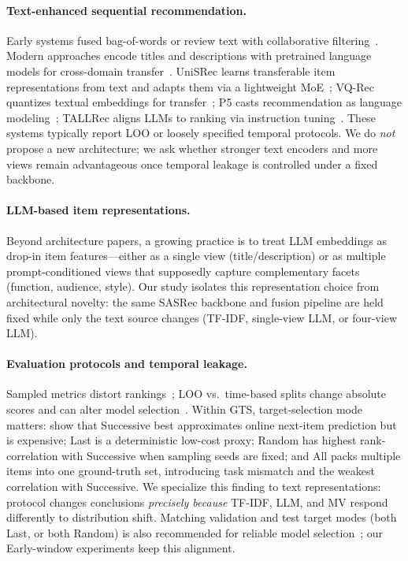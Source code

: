 \documentclass[sigconf,natbib=true,anonymous]{acmart}
\newcommand{\tfidf}{\textsc{TF-IDF}\xspace}
\newcommand{\llm}{\textsc{LLM}\xspace}
\newcommand{\mv}{\textsc{MV}\xspace}
\begin{document}
\paragraph{Text-enhanced sequential recommendation.}
Early systems fused bag-of-words or review text with collaborative filtering~\cite{wang2015cdl,salton1988termweighting}.
Modern approaches encode titles and descriptions with pretrained language models for cross-domain transfer~\cite{hou2022unisrec,hou2023vqrec,geng2022p5,bao2023tallrec}.
UniSRec learns transferable item representations from text and adapts them via a lightweight MoE~\cite{hou2022unisrec}; VQ-Rec quantizes textual embeddings for transfer~\cite{hou2023vqrec}; P5 casts recommendation as language modeling~\cite{geng2022p5}; TALLRec aligns LLMs to ranking via instruction tuning~\cite{bao2023tallrec}.
These systems typically report LOO or loosely specified temporal protocols.
We do \emph{not} propose a new architecture; we ask whether stronger text encoders and more views remain advantageous once temporal leakage is controlled under a fixed backbone.

\paragraph{LLM-based item representations.}
Beyond architecture papers, a growing practice is to treat LLM embeddings as drop-in item features---either as a single view (title/description) or as multiple prompt-conditioned views that supposedly capture complementary facets (function, audience, style).
Our study isolates this representation choice from architectural novelty: the same SASRec backbone and fusion pipeline are held fixed while only the text source changes (\tfidf, single-view \llm, or four-view \llm).

\paragraph{Evaluation protocols and temporal leakage.}
Sampled metrics distort rankings~\cite{krichene2020sampledmetrics}; LOO vs.\ time-based splits change absolute scores and can alter model selection~\cite{ji2023evaluation,sun2023reevaluation,meng2020temporal}.
Within GTS, target-selection mode matters: \citet{liang2024timetosplit} show that Successive best approximates online next-item prediction but is expensive; Last is a deterministic low-cost proxy; Random has highest rank-correlation with Successive when sampling seeds are fixed; and All packs multiple items into one ground-truth set, introducing task mismatch and the weakest correlation with Successive.
We specialize this finding to text representations: protocol changes conclusions \emph{precisely because} \tfidf, \llm, and \mv respond differently to distribution shift.
Matching validation and test target modes (both Last, or both Random) is also recommended for reliable model selection~\cite{liang2024timetosplit}; our Early-window experiments keep this alignment.
\end{document}

